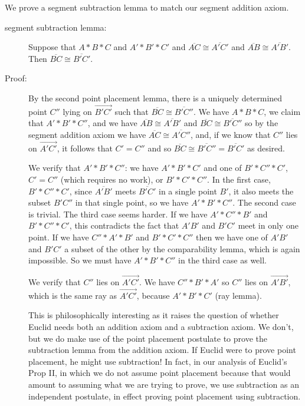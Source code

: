 \documentclass[12pt]{article}
\begin{document}
We prove a segment subtraction lemma to match our segment addition axiom.

\begin{description}

\item[segment subtraction lemma:]  Suppose that $A*B*C$ and $A'*B'*C'$ and $\overline{AC} \cong \overline{A'C'}$ and $\overline{AB} \cong \overline{A'B'}$.  Then $\overline{BC} \cong \overline{B'C'}$.  

\item[Proof:]  By the second point placement lemma, there is a uniquely determined point $C''$ lying on $\overrightarrow{B'C'}$ such
that $\overline{BC} \cong \overline {B'C''}$.  We have $A*B*C$, we claim that $A'*B'*C''$, and we have $\overline{AB} \cong \overline{A'B'}$ and $\overline{BC} \cong \overline {B'C''}$ so by the segment addition axiom we have $\overline{AC} \cong \overline{A'C''}$, and, if we know that $C''$ lies on $\overrightarrow{A'C'}$, it follows that $C'=C''$ and so
 $\overline{BC} \cong \overline {B'C''}=\overline{B'C'}$ as desired.

We verify that $A'*B'*C''$:  we have $A'*B'*C'$ and one of $B'*C''*C'$, $C'=C''$ (which requires no work), or $B'*C'*C''$.  In the first case, $B'*C''*C'$, since $\overline{A'B'}$ meets
$\overline{B'C'}$ in a single point $B'$, it also meets the subset $B'C''$ in that single point, so we have $A'*B'*C''$.  The second case is trivial.  The third case seems harder.
If we have $A'*C''*B'$ and $B'*C''*C'$, this contradicts the fact that $A'B'$ and $B'C'$ meet in only one point.  If we have $C''*A'*B'$ and $B'*C'*C''$ then we have one of $A'B'$ and
$B'C'$ a subset of the other by the comparability lemma, which is again impossible.  So we must have $A'*B'*C''$ in the third case as well.

We verify that $C''$ lies on $\overrightarrow{A'C'}$.  We have $C''*B'*A'$ so $C''$ lies on $\overrightarrow{A'B'}$, which is the same ray as $\overrightarrow{A'C'}$, because
$A'*B'*C'$ (ray lemma).

This is philosophically interesting as it raises the question of whether Euclid needs both an addition axiom and a subtraction axiom.  We don't, but we do make use of the point placement postulate to prove the subtraction lemma from the addition axiom.  If Euclid were to prove point placement, he might use subtraction!  In fact, in our analysis of Euclid's Prop II, in which we do not assume point placement because that would amount to assuming what we are trying to prove, we use subtraction as an independent postulate, in effect proving point placement using subtraction.

\end{description}
\end{document}
